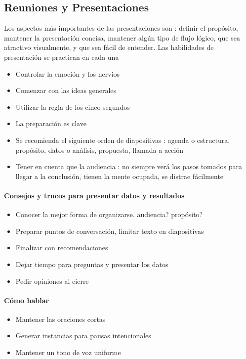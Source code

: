 \subsection{Reuniones y Presentaciones}
Los aspectos más importantes de las presentaciones son : definir el propósito, mantener la presentación concisa, mantener algún tipo de flujo lógico, que sea atractivo visualmente, y que sea fácil de entender. Las habilidades de presentación se practican en cada una
\begin{itemize}
    \item {Controlar la emoción y los nervios}
    \item {Comenzar con las ideas generales}
    \item {Utilizar la regla de los cinco segundos}
    \item {La preparación es clave}
    \item {Se recomienda el siguiente orden de diapositivas : agenda o estructura, propósito, datos o análisis, propuesta, llamada a acción}
    \item {Tener en cuenta que la audiencia : no siempre verá los pasos tomados para llegar a la conclusión, tienen la mente ocupada, se distrae fácilmente}
\end{itemize}

\paragraph{Consejos y trucos para presentar datos y resultados}
\begin{itemize}
    \item {Conocer la mejor forma de organizarse. audiencia? propósito?}
    \item {Preparar puntos de conversación, limitar texto en diapositivas}
    \item {Finalizar con recomendaciones}
    \item {Dejar tiempo para preguntas y presentar los datos}
    \item {Pedir opiniones al cierre}
\end{itemize}

\paragraph{Cómo hablar}
\begin{itemize}
    \item {Mantener las oraciones cortas}
    \item {Generar instancias para pausas intencionales}
    \item {Mantener un tono de voz uniforme}
\end{itemize}

